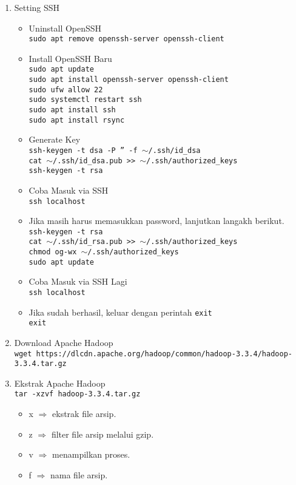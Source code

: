 \documentclass[a4paper]{tufte-handout}
\begin{document}
\begin{enumerate}
\item Setting SSH \\
\begin{itemize}
\item Uninstall OpenSSH \\
{\tt sudo apt remove openssh-server openssh-client}
\item Install OpenSSH Baru \\
{\tt sudo apt update} \\
{\tt sudo apt install openssh-server openssh-client} \\
{\tt sudo ufw allow 22} \\
{\tt sudo systemctl restart ssh} \\
{\tt sudo apt install ssh} \\
{\tt sudo apt install rsync}
\item Generate Key \\
{\tt ssh-keygen -t dsa -P '' -f $\sim$/.ssh/id\_dsa} \\
{\tt cat $\sim$/.ssh/id\_dsa.pub >> $\sim$/.ssh/authorized\_keys} \\
{\tt ssh-keygen -t rsa}
\item Coba Masuk via SSH \\
{\tt ssh localhost}
\item Jika masih harus memasukkan password, lanjutkan langakh berikut. \\
{\tt ssh-keygen -t rsa} \\
{\tt cat $\sim$/.ssh/id\_rsa.pub >> $\sim$/.ssh/authorized\_keys} \\
{\tt chmod og-wx $\sim$/.ssh/authorized\_keys} \\
{\tt sudo apt update}
\item Coba Masuk via SSH Lagi \\
{\tt ssh localhost}
\item Jika sudah berhasil, keluar dengan perintah {\tt exit} \\
{\tt exit}
\end{itemize}

\item Download Apache Hadoop \\
{\tt wget https://dlcdn.apache.org/hadoop/common/hadoop-3.3.4/hadoop-3.3.4.tar.gz}

\item Ekstrak Apache Hadoop \\
{\tt tar -xzvf hadoop-3.3.4.tar.gz }
\begin{itemize}
\item x $\Rightarrow$ ekstrak file arsip.
\item z $\Rightarrow$ filter file arsip melalui gzip.
\item v $\Rightarrow$ menampilkan proses.
\item f $\Rightarrow$ nama file arsip.
\end{itemize}


\end{enumerate}
\end{document}
